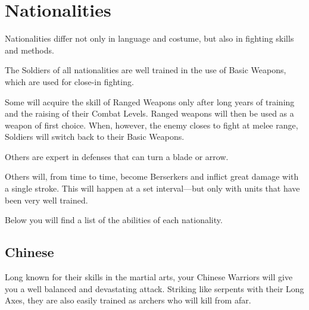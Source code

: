 
\chapter{Nationalities}

Nationalities differ not only in language and costume, but also in fighting skills and methods.

The Soldiers of all nationalities are well trained in the use of Basic Weapons, which are used for close-in fighting.

Some will acquire the skill of Ranged Weapons only after long years of training and the raising of their Combat Levels. Ranged weapons will then be used as a weapon of first choice. When, however, the enemy closes to fight at melee range, Soldiers will switch back to their Basic Weapons.

Others are expert in defenses that can turn a blade or arrow.

Others will, from time to time, become Berserkers and inflict great damage with a single stroke. This will happen at a set interval---but only with units that have been very well trained.

Below you will find a list of the abilities of each nationality.

\clearpage %

\section{Chinese}


Long known for their skills in the martial arts, your Chinese Warriors will give you a well balanced and devastating attack. Striking like serpents with their Long Axes, they are also easily trained as archers who will kill from afar.

